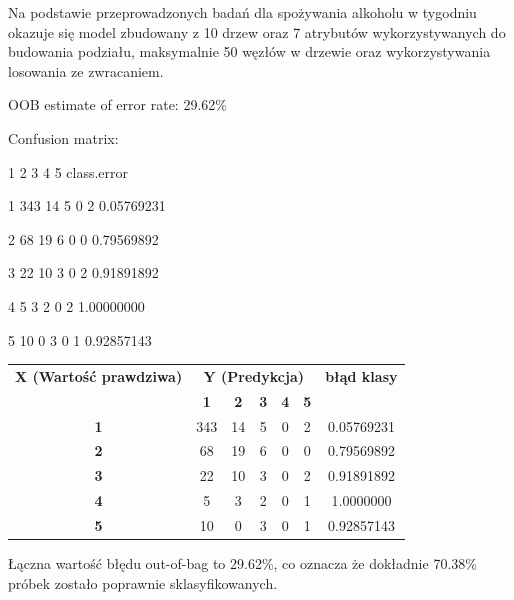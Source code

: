 
Na podstawie przeprowadzonych badań dla spożywania alkoholu w tygodniu okazuje się model zbudowany z 10 drzew oraz 7 atrybutów wykorzystywanych do  budowania podziału, maksymalnie 50 węzłów w drzewie oraz wykorzystywania losowania ze zwracaniem.


 OOB estimate of  error rate: 29.62\%
 

 Confusion matrix:
 
   1  2 3 4 5   class.error
   
 1 343 14 5 0 2  0.05769231
 
 2  68 19 6 0 0  0.79569892
 
 3  22 10 3 0 2  0.91891892
 
 4   5  3 2 0 2  1.00000000
 
 
 5  10  0 3 0 1  0.92857143
\begin{table}[h]
\begin{tabular}{|c|c|c|c|c|c|c|}
\hline
\multirow{}{}{\textbf{X (Wartość prawdziwa)}} & \multicolumn{5}{c|}{\textbf{Y (Predykcja)}}                                & \multirow{}{}{\textbf{błąd klasy}} \\ \cline{2-6}
                            & \textbf{1} & \textbf{2} & \textbf{3} & \textbf{4} & \textbf{5} &                                      \\ \hline
\textbf{1}                  & 343        & 14         & 5          & 0          & 2          & 0.05769231                           \\ \hline
\textbf{2}                  & 68         & 19         & 6          & 0          & 0          & 0.79569892                           \\ \hline
\textbf{3}                  & 22         & 10         & 3          & 0          & 2          & 0.91891892                           \\ \hline
\textbf{4}                  & 5          & 3          & 2          & 0          & 1          & 1.0000000                            \\ \hline
\textbf{5}                  & 10         & 0          & 3          & 0          & 1          & 0.92857143                           \\ \hline
\end{tabular}
\end{table}

Łączna wartość błędu out-of-bag to 29.62\%, co oznacza że dokładnie 70.38\% próbek zostało poprawnie sklasyfikowanych. 

